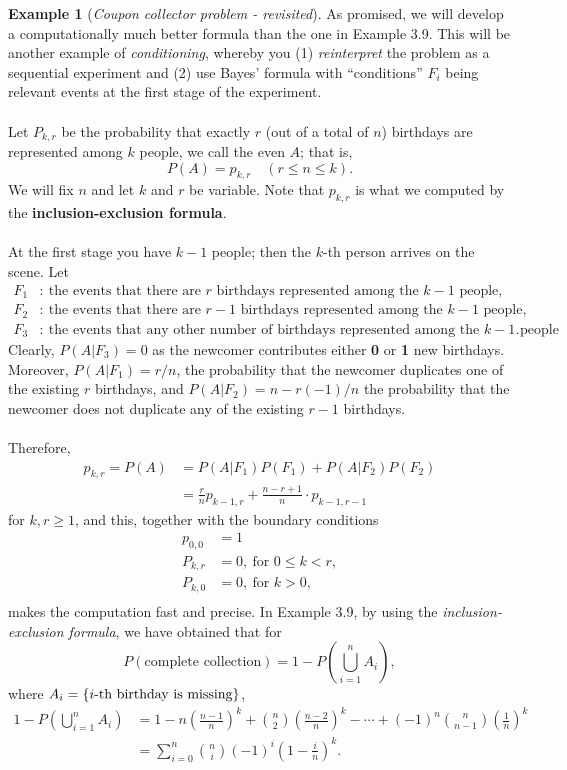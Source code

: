 \documentclass[12pt,a4paper]{article}
\theoremstyle{definition}
\newtheorem{example}{Example}[section]
\theoremstyle{definition}
\theoremstyle{definition}
\theoremstyle{definition}
\theoremstyle{remark}
\theoremstyle{definition}
\begin{document}
\begin{example}[\it Coupon collector problem - revisited] As promised, we will develop a computationally much better formula than the one in Example 3.9. This will be another example of \textit{conditioning}, whereby you (1) \textit{reinterpret} the problem as a sequential experiment and (2) use Bayes' formula with ``conditions'' $F_i$ being relevant events at the first stage of the experiment.\\
\\
Let $P_{k,r}$ be the probability that exactly $r$ (out of a total of $n$) birthdays are represented among $k$ people, we call the even $A$; that is, \[
P(A)=p_{k,r}\quad(r\leq n\leq k).
\] We will fix $n$ and let $k$ and $r$ be variable. Note that $p_{k,r}$ is what we computed by the \textbf{inclusion-exclusion formula}.\\
\\ At the first stage you have $k-1$ people; then the $k$-th person arrives on the scene. Let \begin{align*}
F_1&:\ \text{the events that there are $r$ birthdays represented among the $k-1$ people,}\\
F_2&:\ \text{the events that there are $r-1$ birthdays represented among the $k-1$ people,}\\
F_3&:\ \text{the events that any other number of birthdays represented among the $k-1$ people}.
\end{align*} Clearly, $P(A|F_3)=0$ as the newcomer contributes either \textbf{0} or \textbf{1} new birthdays. Moreover, $P(A|F_1)=r/n$, the probability that the newcomer duplicates one of the existing $r$ birthdays, and $P(A|F_2)=n-r(-1)/n$ the probability that the newcomer does not duplicate any of the existing $r-1$ birthdays.\\
\\
Therefore, \begin{align*}
p_{k,r}=P(A)&=P(A|F_1)P(F_1)+P(A|F_2)P(F_2)\\
&=\frac{r}{n}p_{k-1,r}+\frac{n-r+1}{n}\cdot p_{k-1,r-1}
\end{align*} for $k,r\geq 1$, and this, together with the boundary conditions \begin{align*}
p_{0,0}&=1\\
P_{k,r}&=0,\ \text{for $0\leq k<r$},\\
P_{k,0}&=0,\ \text{for $k>0$},\\
\end{align*} makes the computation fast and precise. In Example 3.9, by using the \textit{inclusion-exclusion formula}, we have obtained that for \[
P(\text{complete collection})=1-P\left(\bigcup_{i=1}^nA_i\right),
\] where $A_i=\set{i\text{-th birthday is missing}}$, \begin{align*}
1-P\left(\bigcup_{i=1}^nA_i\right)&=1-n\left(\frac{n-1}{n}\right)^k+\binom{n}{2}\left(\frac{n-2}{n}\right)^k-\cdots+(-1)^n\binom{n}{n-1}\left(\frac{1}{n}\right)^k\\
&=\sum_{i=0}^{n}\binom{n}{i}(-1)^i\left(1-\frac{i}{n}\right)^k.
\end{align*}
\end{example}
\end{document}

